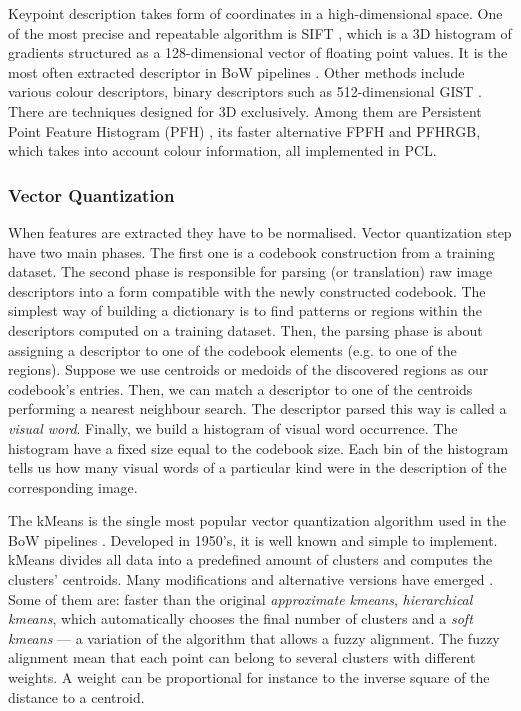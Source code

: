 		Keypoint description takes form of coordinates in a high-dimensional space. One of the most precise and repeatable algorithm is SIFT \cite{sift_features}, which is a 3D histogram of gradients structured as a 128-dimensional vector of floating point values. It is the most often extracted descriptor in BoW pipelines . Other methods include various colour descriptors, binary descriptors such as 512-dimensional GIST \cite{ponce2011cv}. There are techniques designed for 3D exclusively. Among them are Persistent Point Feature Histogram (PFH) \cite{pfh_rusu2008}, its faster alternative FPFH \cite{fpfh_rusu2009} and PFHRGB, which takes into account colour information, all implemented in PCL.
		
		\subsubsection{Vector Quantization}
		When features are extracted they have to be normalised. Vector quantization step have two main phases. The first one is a codebook construction from a training dataset. The second phase is responsible for parsing (or translation) raw image descriptors into a form compatible with the newly constructed codebook. The simplest way of building a dictionary is to find patterns or regions within the descriptors computed on a training dataset. Then, the parsing phase is about assigning a descriptor to one of the codebook elements (e.g. to one of the regions). Suppose we use centroids or medoids of the discovered regions as our codebook's entries. Then, we can match a descriptor to one of the centroids performing a nearest neighbour search. The descriptor parsed this way is called a \textit{visual word}. Finally, we build a histogram of visual word occurrence. The histogram have a fixed size equal to the codebook size. Each bin of the histogram tells us how many visual words of a particular kind were in the description of the corresponding image.
		
		The kMeans is the single most popular vector quantization algorithm used in the BoW pipelines \cite{tsai2012bag}. Developed in 1950's, it is well known and simple to implement. kMeans divides all data into a predefined amount of clusters and computes the clusters' centroids. Many modifications and alternative versions have emerged \cite{kmeans_jain2010data}. Some of them are: faster than the original \emph{approximate kmeans}, \emph{hierarchical kmeans}, which automatically chooses the final number of clusters and a \emph{soft kmeans} --- a variation of the algorithm that allows a fuzzy alignment. The fuzzy alignment mean that each point can belong to several clusters with different weights. A weight can be proportional for instance to the inverse square of the distance to a centroid. 
		

